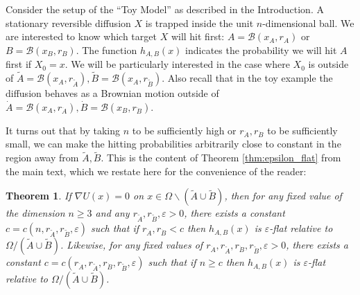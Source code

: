 \documentclass[nofootinbib,english, aip, jcp, priprint, graphicx,floatfix]{revtex4-1}
\newtheorem{theorem}{Theorem}
\theoremstyle{plain}
\theoremstyle{definition}
\theoremstyle{plain}
\newcommand{\bb}[1]{\mathcal{B}\left(#1\right)}
\newcommand{\dA}{{\dot A}}
\newcommand{\tA}{{\tilde A}}
\newcommand{\dB}{{\dot B}}
\newcommand{\tB}{{\tilde B}}
\begin{document}
Consider the setup of the ``Toy Model'' as described in the Introduction.  A stationary reversible diffusion $X$ is trapped inside the unit $n$-dimensional ball.  We are interested to know which target $X$ will hit first: $A=\bb{x_A,r_A}$ or $B=\bb{x_B,r_B}$.  The function $h_{A,B}(x)$ indicates the probability we will hit $A$ first if $X_0=x$.  We will be particularly interested in the case where $X_0$ is outside of $\tilde A=\bb{x_A,r_{\tilde A}},\tilde B=\bb{x_A,r_{\tilde B}}$.  Also recall that in the toy example the diffusion behaves as a Brownian motion outside of $\dot A=\bb{x_A,r_{\dot A}},\dot B=\bb{x_B,r_{\dot B}}$.  

It turns out that by taking $n$ to be sufficiently high or $r_{\dot A},r_{\dot B}$ to be sufficiently small, we can make the hitting probabilities arbitrarily close to constant in the region away from $\tilde A,\tilde B$.  This is the content of Theorem \ref{thm:epsilon_flat} from the main text, which we restate here for the convenience of the reader:

\begingroup
\def\thetheorem{\ref{thm:epsilon_flat}}
\begin{theorem}  
If $\nabla U(x)=0$ on $x\in\Omega\backslash(\tA\cup\tB)$, then
for any fixed value of the dimension $n \geq 3$ and any $r_{\tilde{A}}, r_{\tilde{B}}, \varepsilon > 0$, there exists a constant $c=c(n, r_{\tilde{A}}, r_{\tilde{B}}, \varepsilon)$ such that if $r_{\dA}, r_{\dB} < c$ then 
$h_{A,B}(x)$ is 
$\varepsilon$-flat  relative to 
$\Omega / (\tilde{A} \cup \tilde{B})$.  
Likewise, for any fixed values of $r_{\dA}, r_{\tilde{A}}, r_{\dB}, r_{\tilde{B}}, \varepsilon>0$, there exists a constant $c=c(r_\dA, r_{\tilde{A}}, r_\dB, r_{\tilde{B}}, \varepsilon)$ such that if $n \geq c$ then 
$h_{A,B}(x)$ is
$\varepsilon$-flat relative to 
$\Omega / (\tilde{A} \cup \tilde{B})$. 
\end{theorem}
\addtocounter{theorem}{-1}
\endgroup
\end{document}
